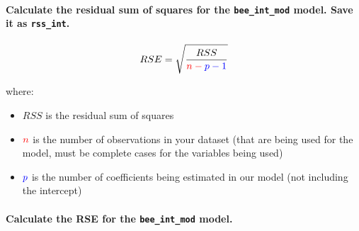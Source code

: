 \documentclass[
  openany]{book}
\newenvironment{Shaded}{\begin{snugshade}}{\end{snugshade}}
\newcommand{\DecValTok}[1]{\textcolor[rgb]{0.00,0.00,0.81}{#1}}
\newcommand{\FunctionTok}[1]{\textcolor[rgb]{0.00,0.00,0.00}{#1}}
\newcommand{\NormalTok}[1]{#1}
\newcommand{\OtherTok}[1]{\textcolor[rgb]{0.56,0.35,0.01}{#1}}
\newcommand{\SpecialCharTok}[1]{\textcolor[rgb]{0.00,0.00,0.00}{#1}}
\providecommand{\tightlist}{%
  \setlength{\itemsep}{0pt}\setlength{\parskip}{0pt}}
\begin{document}
\hypertarget{calculate-the-residual-sum-of-squares-for-the-bee_int_mod-model.-save-it-as-rss_int.}{%
\paragraph{\texorpdfstring{Calculate the residual sum of squares for the \texttt{bee\_int\_mod} model. Save it as \texttt{rss\_int}.}{Calculate the residual sum of squares for the bee\_int\_mod model. Save it as rss\_int.}}\label{calculate-the-residual-sum-of-squares-for-the-bee_int_mod-model.-save-it-as-rss_int.}}

\begin{Shaded}
\end{Shaded}

\[RSE = \sqrt{\frac{RSS}{\color{red}n-\color{blue}p-1}}\]

where:

\begin{itemize}
\tightlist
\item
  \(RSS\) is the residual sum of squares
\item
  \(\color{red}n\) is the number of observations in your dataset (that are being used for the model, must be complete cases for the variables being used)
\item
  \(\color{blue}p\) is the number of coefficients being estimated in our model (not including the intercept)
\end{itemize}

\hypertarget{calculate-the-rse-for-the-bee_int_mod-model.}{%
\paragraph{\texorpdfstring{Calculate the RSE for the \texttt{bee\_int\_mod} model.}{Calculate the RSE for the bee\_int\_mod model.}}\label{calculate-the-rse-for-the-bee_int_mod-model.}}
\end{document}
